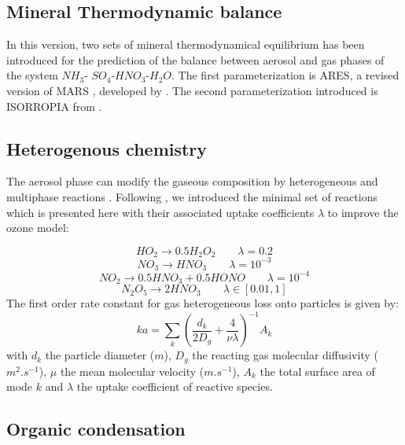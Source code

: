 \subsection{Mineral Thermodynamic balance}
In this version, two sets of mineral thermodynamical equilibrium has been 
introduced for 
the prediction of the balance between aerosol and gas phases of the  system $NH_3$-
$SO_4$-$HNO_3$-$H_2O$.
The first parameterization is ARES, a revised version of MARS \citep{Saxena-1986}, 
developed by \citet{Binkowski-1995}.
The second parameterization introduced is ISORROPIA from \citet{Nenes-1998}. 

\subsection{Heterogenous chemistry}
The aerosol phase can modify the gaseous composition by heterogeneous and 
multiphase reactions
\citep{Ravishankara-1997}. Following \citet{Jacob-2000}, we introduced the 
minimal set of reactions which is presented here with their associated uptake 
coefficients $\lambda$ to improve the  ozone model:

\begin{equation}
HO_2 \rightarrow 0.5 H_2O_2 \qquad   \lambda = 0.2 
\label{hetero1}
\end{equation}
\begin{equation}
NO_3 \rightarrow HNO_3   \qquad   \lambda = 10^{-3} 
\label{hetero2}
\end{equation}
\begin{equation}
NO_2 \rightarrow 0.5 HNO_3 + 0.5 HONO  \qquad    \lambda = 10^{-4}  
\label{hetero3}
\end{equation}
\begin{equation}
N_2O_5 \rightarrow 2 HNO_3 \qquad    \lambda \in [0.01,1] 
\label{hetero4}
\end{equation}
The first order rate constant for gas heterogeneous loss onto particles is given 
by:\\
\begin{equation}
ka = \sum_{k}\left(\frac{d_k}{2D_g} +  \frac{4}{\nu \lambda} \right)^{-1} A_k
\label{ka}
\end{equation}
with $d_k$ the particle diameter ($m$), $D_g$ the reacting gas molecular 
diffusivity ($m^2.s^{-1}$), $\mu$ 
the mean molecular velocity ($m.s^{-1}$), $A_k$ the total surface area of mode 
$k$ and $\lambda$ the uptake coefficient of reactive species.

\subsection{Organic condensation}

